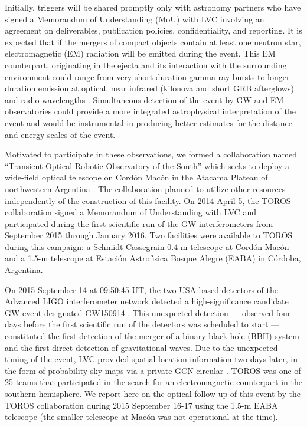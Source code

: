 \documentclass[apjl]{emulateapj}
\begin{document}
Initially, triggers will be shared promptly only with astronomy partners who have signed a Memorandum of Understanding (MoU) with LVC involving an agreement on deliverables, publication policies, confidentiality, and reporting. It is expected that if the mergers of compact objects contain at least one neutron star, electromagnetic (EM) radiation will be emitted during the event. This EM counterpart, originating in the ejecta and its interaction with the surrounding environment could range from very short duration gamma-ray bursts to longer-duration emission at optical, near infrared (kilonova and short GRB afterglows) and radio wavelengths \citep[e.g.,][]{Li1998,Nakar2011,Metzger2012,Barnes2013,Berger2014,Cowperthwaite2015}. Simultaneous detection of the event by GW and EM observatories could provide a more integrated  astrophysical interpretation of the event and would be instrumental in producing better estimates for the distance and energy scales of the event.

Motivated to participate in these observations, we formed a collaboration named ``Transient Optical Robotic Observatory of the South'' \citep[TOROS;][]{Benacquista2014} which seeks to deploy a wide-field optical telescope on Cord\'on Mac\'on in the Atacama Plateau of northwestern Argentina \citep{Renzi2009,Tremblin2012}. The collaboration planned to utilize other resources independently of the construction of this facility. On 2014 April 5, the TOROS collaboration signed a Memorandum of Understanding with LVC  and participated during the first scientific run of the GW interferometers from September 2015 through January 2016. Two facilities were available to TOROS during this campaign: a Schmidt-Cassegrain 0.4-m telescope at Cord\'on Mac\'on and a 1.5-m telescope at Estaci\'on Astrof\'{\i}sica Bosque Alegre (EABA) in C\'ordoba, Argentina.  

On 2015 September 14 at 09:50:45 UT, the two USA-based detectors of the Advanced LIGO interferometer network detected a high-significance candidate GW event designated GW150914 \citep{Abbott2016a}. This unexpected detection --- observed four days before the first scientific run of the detectors was scheduled to start --- constituted the first detection of the merger of a binary black hole (BBH) system and the first direct detection of gravitational waves. Due to the unexpected timing of the event, LVC provided spatial location information two days later, in the form of probability sky maps via a private GCN circular \citep[GCN\#18330]{Singer2015}. TOROS was one of 25 teams that participated in the search for an electromagnetic counterpart in the southern hemisphere. We report here on the optical follow up of this event by the TOROS collaboration during 2015 September 16-17 using the 1.5-m EABA telescope (the smaller telescope at Mac\'on was not operational at the time).
\end{document}
